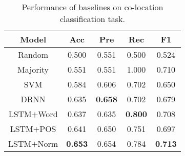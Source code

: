 \begin{table}[th]
	\centering
	\small
	\begin{tabular}{|c|c|c|c|c|}
		\hline
		\textbf{Model}	& \textbf{Acc} & \textbf{Pre} & \textbf{Rec} & \textbf{F1} \\		\hline \hline
		Random &	0.500 & 0.551 & 0.500 & 0.524  \\		\hline
		Majority &	0.551 & 0.551 & 1.000 & 0.710 \\		\hline
		
		SVM &	0.584 & 0.606 & 0.702  & 0.650  \\		\hline
		DRNN	&  0.635 &  \textbf{0.658} &  0.702 & 	0.679	\\ \hline
		LSTM$+$Word 	&   0.637 & 0.635 & \textbf{0.800}   & 	 0.708	\\ \hline
		LSTM$+$POS	& 0.641 & 0.650  &  0.751 & 0.697	\\ \hline
		LSTM$+$Norm	&  \textbf{0.653 }&  0.654 & { 0.784} & 	\textbf{0.713}	\\ \hline
	\end{tabular}
	\caption{Performance of baselines on co-location classification task.}
	\label{tab:aprf}
\end{table}

